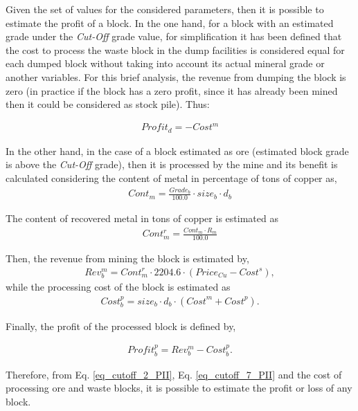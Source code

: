 Given the set of values for the considered parameters, then it is possible to estimate the profit of a block. In the one hand, for a block with an estimated grade under the \emph{Cut-Off} grade value, for simplification it has been defined that the cost to process the waste block in the dump facilities is considered equal for each dumped block without taking into account its actual mineral grade or another variables. For this brief analysis, the revenue from dumping the block is zero (in practice if the block has a zero profit, since it has already been mined then it could be considered as stock pile). Thus:

\begin{align}\label{eq_cutoff_2_PII}
Profit_{d} = - Cost^m 
\end{align}

In the other hand, in the case of a block estimated as ore (estimated block grade is above the \emph{Cut-Off} grade), then it is processed by the mine and its benefit is calculated considering the content of metal in percentage of tons of copper as,
\begin{align}\label{eq_cutoff_3_PII}
Cont_{m} = \frac{Grade_{b}}{100.0}  \cdot size_b \cdot d_b
\end{align}

The content of recovered metal in tons of copper is estimated as 
\begin{align}\label{eq_cutoff_4_PII}
Cont_{m}^r = \frac{Cont_{m} \cdot R_{m}}{100.0}
\end{align}

Then, the revenue from mining the block is estimated by,
\begin{align}\label{eq_cutoff_5_PII}
Rev_{b}^{m} = Cont_{m}^{r} \cdot 2204.6 \cdot (Price_{Cu}-Cost^s),
\end{align}
while the processing cost of the block is estimated as
\begin{align}\label{eq_cutoff_6_PII}
Cost_b^p = size_b \cdot d_b \cdot ({Cost}^m + {Cost}^p). 
\end{align}

Finally, the profit of the processed block is defined by,

\begin{align}\label{eq_cutoff_7_PII}
Profit_{b}^p = Rev_{b}^m  -  Cost_{b}^p.
\end{align}

Therefore, from Eq. \eqref{eq_cutoff_2_PII}, Eq. \eqref{eq_cutoff_7_PII} and the cost of processing ore and waste blocks, it is possible to estimate the profit or loss of any block.

